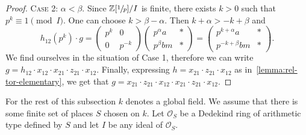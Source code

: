 \begin{proof}
\textsc{Case 2:} $\alpha<\beta$. 
Since $\mathbb{Z}[\sfrac{1}{p}]/I$ is finite, there exists $k>0$ such that $p^k\equiv 1\pmod I$.
One can choose $k>\beta-\alpha$.
Then $k+\alpha>-k+\beta$ and
\[ h_{12}\left(p^k\right)\cdot g =
\begin{pmatrix} p^k & 0 \\ 0 & p^{-k} \end{pmatrix}
\begin{pmatrix} p^\alpha a & * \\ p^\beta bm & * \end{pmatrix}=
\begin{pmatrix} p^{k+\alpha} a & * \\ p^{-k+\beta} bm & * \end{pmatrix}. \]
We find ourselves in the situation of Case 1, therefore we can write $g=h_{12}\cdot x_{12} \cdot x_{21} \cdot z_{21} \cdot x_{12}$.
Finally, expressing $h=x_{21}\cdot z_{21}\cdot x_{12}$ as in~\cref{lemma:rel-tor-elementary}, we get that $g=x_{21} \cdot z_{21} \cdot x_{12} \cdot x_{21} \cdot z_{21} \cdot x_{12}$.
\end{proof}

For the rest of this subsection $k$ denotes a global field. We assume that there is some finite set of places $S$ chosen on $k$. 
Let $\mathcal{O}_S$ be a Dedekind ring of arithmetic type defined by $S$ and let $I$ be any ideal of $\mathcal{O}_S$.

